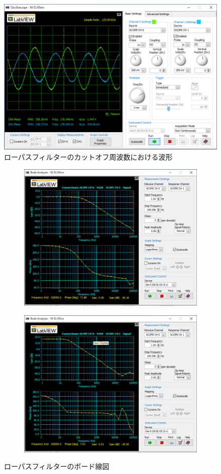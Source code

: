 \begin{figure}
	\centering
	\includegraphics[width=0.8\linewidth]{src/figures/exp8/low-pass.png}
	\caption{ローパスフィルターのカットオフ周波数における波形}\label{fig:exp8-raw-cutoff}
\end{figure}

\begin{figure}
	\centering
	\begin{subfigure}{0.8\linewidth}
		\centering
		\includegraphics[width=0.8\linewidth]{src/figures/exp8/low-pass-bode-10k.png}
	\end{subfigure}
	\begin{subfigure}{0.8\linewidth}
		\centering
		\includegraphics[width=0.8\linewidth]{src/figures/exp8/low-pass-bode-1m.png}
	\end{subfigure}
	\caption{ローパスフィルターのボード線図}\label{fig:exp8-bode}
\end{figure}
